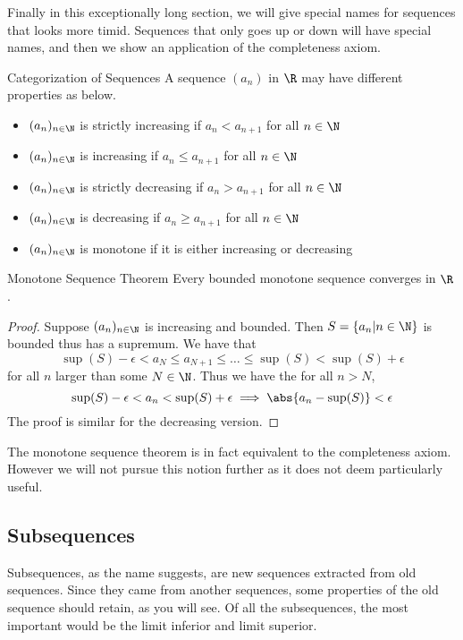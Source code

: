 Finally in this exceptionally long section, we will give special names for sequences that looks more timid. Sequences that only goes up or down will have special names, and then we show an application of the completeness axiom. 

\begin{defn}{Categorization of Sequences}{} A sequence $(a_n)$ in $\R$ may have different properties as below. 
\begin{itemize}
\item $(a_n)_{n\in\N}$ is strictly increasing if $a_n<a_{n+1}$ for all $n\in\N$
\item $(a_n)_{n\in\N}$ is increasing if $a_n\leq a_{n+1}$ for all $n\in\N$
\item $(a_n)_{n\in\N}$ is strictly decreasing if $a_n>a_{n+1}$ for all $n\in\N$
\item $(a_n)_{n\in\N}$ is decreasing if $a_n\geq a_{n+1}$ for all $n\in\N$
\item $(a_n)_{n\in\N}$ is monotone if it is either increasing or decreasing
\end{itemize}
\end{defn}

\begin{thm}{Monotone Sequence Theorem}{} Every bounded monotone sequence converges in $\R$. \tcbline
\begin{proof} Suppose $(a_n)_{n\in\N}$ is increasing and bounded. Then $S=\{a_n|n\in\N\}$ is bounded thus has a supremum. We have that $$\sup(S)-\epsilon< a_N\leq a_{N+1}\leq\dots\leq\sup(S)<\sup(S)+\epsilon$$ for all $n$ larger than some $N\in\N$. Thus we have the for all $n>N$, $$\sup(S)-\epsilon<a_n<\sup(S)+\epsilon\implies\abs{a_n-\sup(S)}<\epsilon$$ The proof is similar for the decreasing version. 
\end{proof}
\end{thm}

The monotone sequence theorem is in fact equivalent to the completeness axiom. However we will not pursue this notion further as it does not deem particularly useful. 

\subsection{Subsequences}
Subsequences, as the name suggests, are new sequences extracted from old sequences. Since they came from another sequences, some properties of the old sequence should retain, as you will see. Of all the subsequences, the most important would be the limit inferior and limit superior. 

